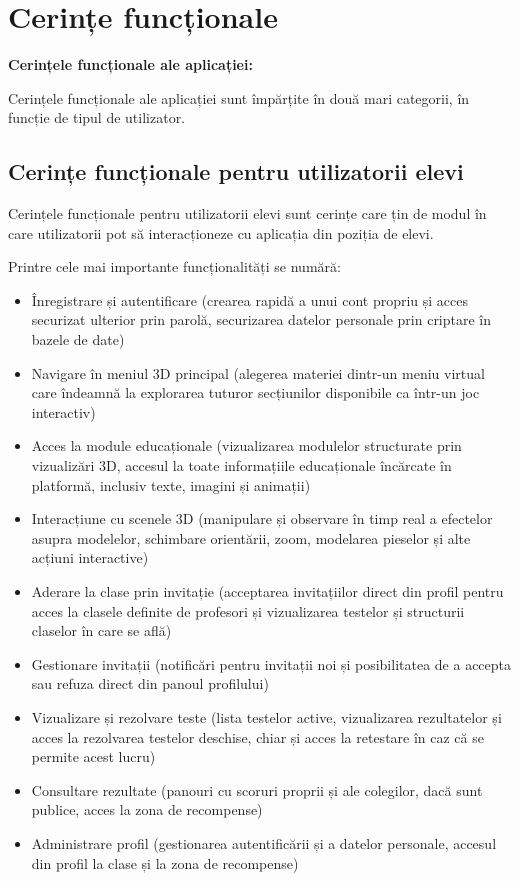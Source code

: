\section{Cerințe funcționale}
\label{sec:proj-requirements}

\textbf{Cerințele funcționale ale aplicației:}

Cerințele funcționale ale aplicației sunt împărțite în două mari categorii, în funcție de tipul de utilizator.

\subsection{Cerințe funcționale pentru utilizatorii elevi}
\label{sub-sec:proj-requirements-students}

Cerințele funcționale pentru utilizatorii elevi sunt cerințe care țin de modul în care utilizatorii pot să
interacționeze cu aplicația din poziția de elevi.

Printre cele mai importante funcționalități se numără: 
\begin{itemize}
  \item Înregistrare și autentificare (crearea rapidă a unui cont propriu și acces securizat ulterior prin parolă, securizarea datelor personale
  prin criptare în bazele de date)
  \item Navigare în meniul 3D principal (alegerea materiei dintr-un meniu virtual care îndeamnă la explorarea tuturor secțiunilor disponibile
  ca într-un joc interactiv)
  \item Acces la module educaționale (vizualizarea modulelor structurate prin vizualizări 3D, accesul la toate informațiile educaționale încărcate
  în platformă, inclusiv texte, imagini și animații)
  \item Interacțiune cu scenele 3D (manipulare și observare în timp real a efectelor asupra modelelor, schimbare orientării, zoom, modelarea
  pieselor și alte acțiuni interactive)
  \item Aderare la clase prin invitație (acceptarea invitațiilor direct din profil pentru acces la clasele definite de profesori și vizualizarea
  testelor și structurii claselor în care se află)
  \item Gestionare invitații (notificări pentru invitații noi și posibilitatea de a accepta sau refuza direct din panoul profilului)
  \item Vizualizare și rezolvare teste (lista testelor active, vizualizarea rezultatelor și acces la rezolvarea testelor deschise,
  chiar și acces la retestare în caz că se permite acest lucru)
  \item Consultare rezultate (panouri cu scoruri proprii și ale colegilor, dacă sunt publice, acces la zona de recompense)
  \item Administrare profil (gestionarea autentificării și a datelor personale, accesul din profil la clase și la zona de recompense)
\end{itemize}


